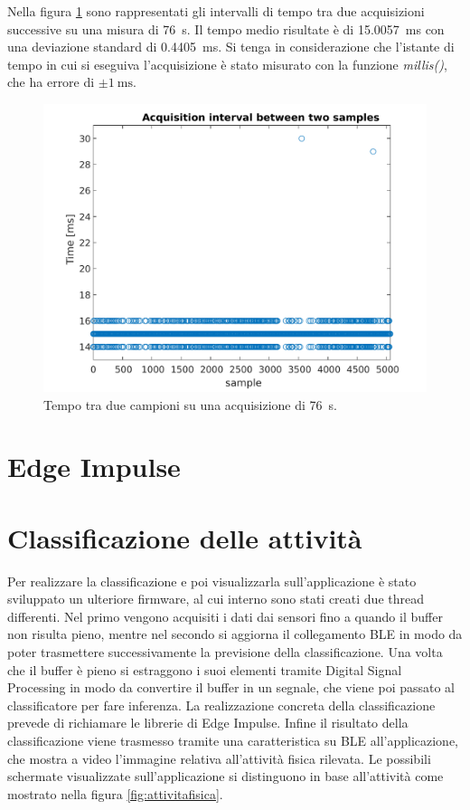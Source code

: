 Nella figura \ref{fig:time_interval} sono rappresentati gli intervalli di tempo tra due acquisizioni successive su una misura di \SI{76}{\second}. Il tempo medio risultate è di \SI{15.0057}{\milli\second} con una deviazione standard di \SI{0.4405}{\milli\second}. Si tenga in considerazione che l'istante di tempo in cui si eseguiva l'acquisizione è stato misurato con la funzione \textit{millis()}, che ha errore di $\pm \SI{1}{\milli\second}$. 
\begin{figure}[tbh]
	\centering
	\includegraphics[width=0.5\linewidth]{./ImageFiles/interval_time.pdf}
	\caption{Tempo tra due campioni su una acquisizione di \SI{76}{\second}.}
	\label{fig:time_interval}
\end{figure}

\section{Edge Impulse}

\section{Classificazione delle attività}
Per realizzare la classificazione e poi visualizzarla sull'applicazione è stato sviluppato un ulteriore firmware, al cui interno sono stati creati due thread differenti. Nel primo vengono acquisiti i dati dai sensori fino a quando il buffer non risulta pieno, mentre nel secondo si aggiorna il collegamento BLE in modo da poter trasmettere successivamente la previsione della classificazione. Una volta che il buffer è pieno si estraggono i suoi elementi tramite Digital Signal Processing in modo da convertire il buffer in un segnale, che viene poi passato al classificatore per fare inferenza. La realizzazione concreta della classificazione prevede di richiamare le librerie di Edge Impulse. Infine il risultato della classificazione viene trasmesso tramite una caratteristica su BLE all'applicazione, che mostra a video l'immagine relativa all'attività fisica rilevata. Le possibili schermate visualizzate sull'applicazione si distinguono in base all'attività come mostrato nella figura \ref{fig:attivitafisica}.

